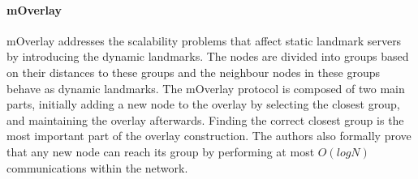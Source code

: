 \documentclass[acmcsur]{acmtrans2m}
\begin{document}
\paragraph*{\bf mOverlay}
mOverlay \cite{zhang_moverlay_2004} addresses the scalability problems that
affect static landmark servers by introducing the dynamic landmarks. The
nodes are divided into groups based on their distances to these groups and the
neighbour nodes in these groups behave as dynamic landmarks. The mOverlay
protocol is composed of two main parts, initially adding a new node to the
overlay by selecting the closest group, and maintaining the overlay afterwards.
Finding the correct closest group is the most important part of the overlay
construction. The authors also formally prove that any new node can reach its
group by performing at most $O(logN)$ communications within the network.

\renewcommand\arraystretch{1.4}%
\end{document}
